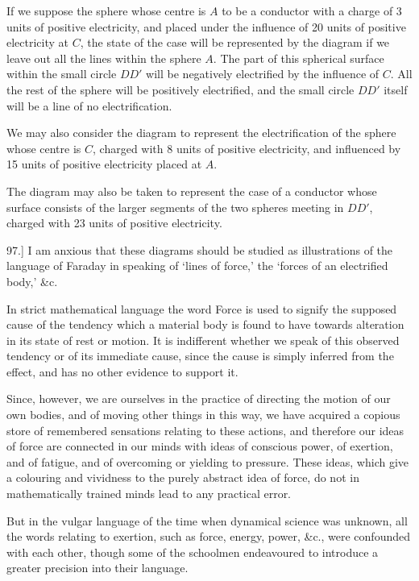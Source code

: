 \documentclass[12pt,oneside]{book}[2021/10/04]
\newcommand{\article}[1]{\phantomsection \label{art:#1}{#1.]}}
\newcommand{\¬}{\hphantom{0}}
\begin{document}
If we suppose the sphere whose centre is \(A\) to be a conductor
with a charge of 3 units of positive electricity, and placed under
the influence of 20 units of positive electricity at \(C\), the state of
the case will be represented by the diagram if we leave out all the
lines within the sphere \(A\). The part of this spherical surface within
the small circle \(DD'\) will be negatively electrified by the influence
of \(C\). All the rest of the sphere will be positively electrified, and
the small circle \(DD'\) itself will be a line of no electrification.

We may also consider the diagram to represent the electrification
of the sphere whose centre is \(C\), charged with 8 units of positive
electricity, and influenced by 15 units of positive electricity placed
at \(A\).

The diagram may also be taken to represent the case of a
conductor whose surface consists of the larger segments of the
two spheres meeting in \(DD'\), charged with 23 units of positive
electricity.

\article{97} I am anxious that these diagrams should be studied as
illustrations of the language of Faraday in speaking of `lines of
force,' the `forces of an electrified body,' \&c.

In strict mathematical language the word Force is used to signify
the supposed cause of the tendency which a material body is found
to have towards alteration in its state of rest or motion. It is
indifferent whether we speak of this observed tendency or of its
immediate cause, since the cause is simply inferred from the effect,
and has no other evidence to support it.

Since, however, we are ourselves in the practice of directing the
motion of our own bodies, and of moving other things in this way,
we have acquired a copious store of remembered sensations relating
to these actions, and therefore our ideas of force are connected in
our minds with ideas of conscious power, of exertion, and of fatigue,
and of overcoming or yielding to pressure. These ideas, which give
a colouring and vividness to the purely abstract idea of force, do
not in mathematically trained minds lead to any practical error.

But in the vulgar language of the time when dynamical science
was unknown, all the words relating to exertion, such as force,
energy, power, \&c., were confounded with each other, though some
of the schoolmen endeavoured to introduce a greater precision into
their language.
\end{document}
